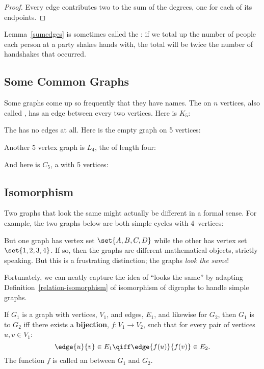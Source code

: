 \begin{proof}
Every edge contributes two to the sum of the degrees, one for each of its endpoints.
\end{proof}

Lemma~\ref{sumedges} is sometimes called the : if we total up the
number of people each person at a party shakes hands with, the total will be twice the
number of handshakes that occurred.

\subsection{Some Common Graphs}
Some graphs come up so frequently that they have names.  The
 on $n$ vertices, also called , has an edge
between every two vertices.  Here is $K_5$:


The  has no edges at all.  Here is the empty graph on 5 vertices:


Another 5 vertex graph is $L_4$, the  of length four:


And here is $C_5$, a  with 5 vertices:


\subsection{Isomorphism}
Two graphs that look the same might actually be different in a formal sense.  For
example, the two graphs below are both simple cycles with 4~vertices:

But one graph has vertex set $\set{A, B, C, D}$ while the other has vertex set $\set{1,
2, 3, 4}$.  If so, then the graphs are different mathematical objects, strictly
speaking.  But this is a frustrating distinction; the graphs \emph{look the same}!

Fortunately, we can neatly capture the idea of ``looks the same'' by adapting
Definition~\ref{relation-isomorphism} of isomorphism of digraphs to handle simple
graphs.

\begin{definition}\label{simple-isomorphism}
  If $G_1$ is a graph with vertices, $V_1$, and edges, $E_1$, and likewise for $G_2$,
  then $G_1$ is  to $G_2$ iff there exists a \textbf{bijection}, $f:
  V_1 \to V_2$, such that for every pair of vertices $u, v \in V_1$:
\[
\edge{u}{v} \in E_1 \qiff \edge{f(u)}{f(v)} \in E_2.
\]
The function $f$ is called an  between $G_1$ and $G_2$.
\end{definition}


